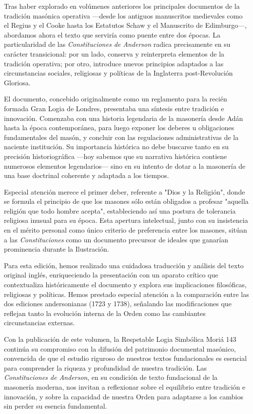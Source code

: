 \documentclass[a4paper,12pt,twoside]{book}
\begin{document}
Tras haber explorado en volúmenes anteriores los principales documentos de la tradición masónica operativa —desde los antiguos manuscritos medievales como el Regius y el Cooke hasta los Estatutos Schaw y el Manuscrito de Edimburgo—, abordamos ahora el texto que serviría como puente entre dos épocas. La particularidad de las \textit{Constituciones de Anderson} radica precisamente en su carácter transicional: por un lado, conserva y reinterpreta elementos de la tradición operativa; por otro, introduce nuevos principios adaptados a las circunstancias sociales, religiosas y políticas de la Inglaterra post-Revolución Gloriosa.

El documento, concebido originalmente como un reglamento para la recién formada Gran Logia de Londres, presentaba una síntesis entre tradición e innovación. Comenzaba con una historia legendaria de la masonería desde Adán hasta la época contemporánea, para luego exponer los deberes u obligaciones fundamentales del masón, y concluir con las regulaciones administrativas de la naciente institución. Su importancia histórica no debe buscarse tanto en su precisión historiográfica —hoy sabemos que su narrativa histórica contiene numerosos elementos legendarios— sino en su intento de dotar a la masonería de una base doctrinal coherente y adaptada a los tiempos.

Especial atención merece el primer deber, referente a "Dios y la Religión", donde se formula el principio de que los masones sólo están obligados a profesar "aquella religión que todo hombre acepta", estableciendo así una postura de tolerancia religiosa inusual para su época. Esta apertura intelectual, junto con su insistencia en el mérito personal como único criterio de preferencia entre los masones, sitúan a las \textit{Constituciones} como un documento precursor de ideales que ganarían prominencia durante la Ilustración.

Para esta edición, hemos realizado una cuidadosa traducción y análisis del texto original inglés, enriqueciendo la presentación con un aparato crítico que contextualiza históricamente el documento y explora sus implicaciones filosóficas, religiosas y políticas. Hemos prestado especial atención a la comparación entre las dos ediciones andersonianas (1723 y 1738), señalando las modificaciones que reflejan tanto la evolución interna de la Orden como las cambiantes circunstancias externas.

Con la publicación de este volumen, la Respetable Logia Simbólica Moriá 143 continúa su compromiso con la difusión del patrimonio documental masónico, convencida de que el estudio riguroso de nuestros textos fundacionales es esencial para comprender la riqueza y profundidad de nuestra tradición. Las \textit{Constituciones de Anderson}, en su condición de texto fundacional de la masonería moderna, nos invitan a reflexionar sobre el equilibrio entre tradición e innovación, y sobre la capacidad de nuestra Orden para adaptarse a los cambios sin perder su esencia fundamental.
\end{document}
